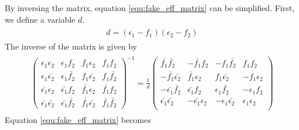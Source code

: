 By inversing the matrix, equation \ref{equ:fake_eff_matrix} can be simplified.
First, we define a variable $d$.
\begin{align}
\begin{split}
d = (\epsilon_1 - f_1) (\epsilon_2 - f_2)
\end{split}
\end{align}
The inverse of the matrix is given by
\begin{align}
\begin{split}
\left( \begin{array}{cccc}
\epsilon_1 \epsilon_2 & \epsilon_1 f_2 & f_1 \epsilon_2 & f_1 f_2 \\
\epsilon_1 \bar{\epsilon_2} & \epsilon_1 \bar{f_2} & f_1 \bar{\epsilon_2} & f_1 \bar{f_2} \\
\bar{\epsilon_1} \epsilon_2 & \bar{\epsilon_1} f_2 & \bar{f_1} \epsilon_2 & \bar{f_1} f_2 \\
\bar{\epsilon_1} \bar{\epsilon_2} & \bar{\epsilon_1} \bar{f_2} & \bar{f_1} \bar{\epsilon_2} & \bar{f_1} \bar{f_2}
\end{array} \right)^{-1}
= \frac{1}{d}
\left( \begin{array}{cccc}
  \bar{f_1}        \bar{f_2}        & - \bar{f_1}        f_2        & - f_1        \bar{f_2}        &   f_1        f_2        \\
- \bar{f_1}        \bar{\epsilon_2} &   \bar{f_1}        \epsilon_2 &   f_1        \bar{\epsilon_2} & - f_1        \epsilon_2 \\
- \bar{\epsilon_1} \bar{f_2}        &   \bar{\epsilon_1} f_2        &   \epsilon_1 \bar{f_2}        & - \epsilon_1 f_2        \\
  \bar{\epsilon_1} \bar{\epsilon_2} & - \bar{\epsilon_1} \epsilon_2 & - \epsilon_1 \bar{\epsilon_2} &   \epsilon_1 \epsilon_2 \\
\end{array} \right)
\end{split}
\end{align}
Equation \ref{equ:fake_eff_matrix} becomes
